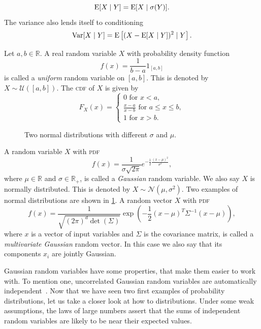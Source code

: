 \[
    \operatorname*{E}[X \mid Y] = \operatorname*{E}[X \mid \sigma(Y)].
\]
The variance also lends itself to conditioning
\[
    \operatorname{Var}[ X \mid Y] = \operatorname*{E}\left[   (X - \operatorname*{E}[X \mid Y])^2 \mid Y\right].
\]
%
%
%
\begin{example}
    Let $a,b \in \mathbb{R}$. A real random variable $X$ with probability density function
\[
    f(x) = \frac{1}{b-a} 1_{[a,b]}
\]
is called a \textit{uniform} random variable on \( [a,b] \). This is denoted by \( X \sim \mathcal{U}([a,b]) \).
The \textsc{cdf} of $X$ is given by
\[
    F_{X}(x) = 
    \begin{cases} 
        0 \text{ for } x < a,\\
        \frac{x-a}{x-b} \text{ for } a \leq x \leq b, \\
        1 \text{ for } x > b.
    \end{cases}
\]
\end{example}
% 
\begin{figure}
    \centering
    
    \caption{Two normal distributions with different $\sigma$ and $\mu$.}
    \label{fig:normal_distribution_plot}
\end{figure}
% 
% 
\begin{example}
A random variable $X$ with \textsc{pdf}
\[
    f(x)=\frac{1}{\sigma \sqrt{2 \pi}} e^{-\frac{1}{2} \frac{(x - \mu)^2}{\sigma^2}},
\]
where \( \mu \in \mathbb{R} \) and \( \sigma \in \mathbb{R}_{+} \), is called a \textit{Gaussian} random variable. We also say $X$ is normally distributed. This is denoted by \( X \sim \mathcal{N}(\mu, \sigma^2) \). Two examples of normal distributions are shown in \cref{fig:normal_distribution_plot}.
A random vector $X$ with \textsc{pdf}
\[
    f(x)=\frac{1}{\sqrt{(2 \pi)^{d} \det(\Sigma) }} \exp\left(  -\frac{1}{2} (x-\mu)^{T}\Sigma^{-1}(x-\mu)\right),
\]
where $x$ is a vector of input variables and $\Sigma$ is the covariance matrix,
is called a \textit{multivariate Gaussian} random vector.
In this case we also say that its components $x_{i}$ are jointly Gaussian.
\end{example}
Gaussian random variables have some properties, that make them easier to work with.
To mention one, uncorrelated Gaussian random variables are automatically independent~\cite[Thm. 3.2.7]{bremaud2020probability}. 
Now that we have seen two first examples of probability distributions, let us take a closer look at how to distributions.
Under some weak assumptions, the laws of large numbers assert that the sums of independent random variables are likely to be near their expected values. 
